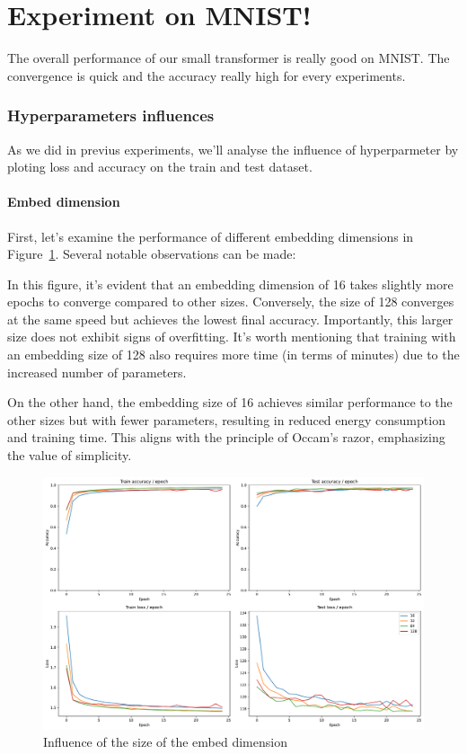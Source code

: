 \section{Experiment on MNIST!}
The overall performance of our small transformer is really good on MNIST. The convergence is quick and the accuracy really high for every experiments.

\subsubsection{Hyperparameters influences}
As we did in previus experiments, we'll analyse the influence of hyperparmeter by ploting loss and accuracy on the train and test dataset.

\paragraph{Embed dimension}
First, let's examine the performance of different embedding dimensions in Figure~\ref{fig:embed_dim_influence}. Several notable observations can be made:

In this figure, it's evident that an embedding dimension of 16 takes slightly more epochs to converge compared to other sizes. Conversely, the size of 128 converges at the same speed but achieves the lowest final accuracy. Importantly, this larger size does not exhibit signs of overfitting. It's worth mentioning that training with an embedding size of 128 also requires more time (in terms of minutes) due to the increased number of parameters.

On the other hand, the embedding size of 16 achieves similar performance to the other sizes but with fewer parameters, resulting in reduced energy consumption and training time. This aligns with the principle of Occam's razor, emphasizing the value of simplicity.

\begin{figure}[H]
    \centering
    \includegraphics*[width=\textwidth]{figs/Transformers/embed_dim_influence_25.pdf}
    \caption{Influence of the size of the embed dimension}
    \label{fig:embed_dim_influence}
\end{figure}

